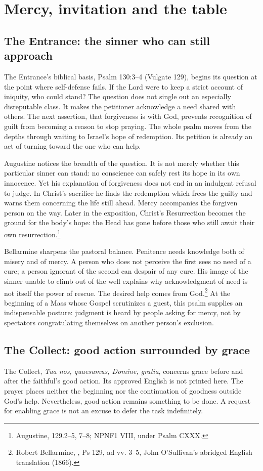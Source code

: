 \section{Mercy, invitation and the table}
\subsection{The Entrance: the sinner who can still approach}
The Entrance's biblical basis, Psalm 130:3--4 (Vulgate 129), begins its question at the point where self-defense fails. If the Lord were to keep a strict account of iniquity, who could stand? The question does not single out an especially disreputable class. It makes the petitioner acknowledge a need shared with others. The next assertion, that forgiveness is with God, prevents recognition of guilt from becoming a reason to stop praying. The whole psalm moves from the depths through waiting to Israel's hope of redemption. Its petition is already an act of turning toward the one who can help.

Augustine notices the breadth of the question. It is not merely whether this particular sinner can stand: no conscience can safely rest its hope in its own innocence. Yet his explanation of forgiveness does not end in an indulgent refusal to judge. In Christ's sacrifice he finds the redemption which frees the guilty and warns them concerning the life still ahead. Mercy accompanies the forgiven person on the way. Later in the exposition, Christ's Resurrection becomes the ground for the body's hope: the Head has gone before those who still await their own resurrection.\footnote{Augustine,  129.2--5, 7--8; NPNF1 VIII, under Psalm CXXX.}

Bellarmine sharpens the pastoral balance. Penitence needs knowledge both of misery and of mercy. A person who does not perceive the first sees no need of a cure; a person ignorant of the second can despair of any cure. His image of the sinner unable to climb out of the well explains why acknowledgment of need is not itself the power of rescue. The desired help comes from God.\footnote{Robert Bellarmine, , Ps 129, ad vv. 3--5, John O'Sullivan's abridged English translation (1866).} At the beginning of a Mass whose Gospel scrutinizes a guest, this psalm supplies an indispensable posture: judgment is heard by people asking for mercy, not by spectators congratulating themselves on another person's exclusion.

\subsection{The Collect: good action surrounded by grace}
\label{proper-collect}
The Collect, \textit{Tua nos, quaesumus, Domine, gratia}, concerns grace before and after the faithful's good action. Its approved English is not printed here. The prayer places neither the beginning nor the continuation of goodness outside God's help. Nevertheless, good action remains something to be done. A request for enabling grace is not an excuse to defer the task indefinitely.

